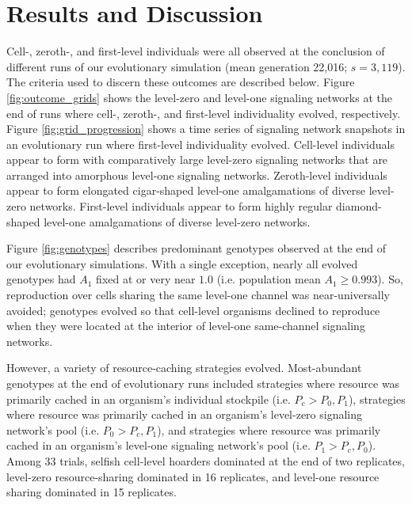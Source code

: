 \section{Results and Discussion}











Cell-, zeroth-, and first-level individuals were all observed at the conclusion of different runs of our evolutionary simulation (mean generation 22,016; $s=3,119$).
The criteria used to discern these outcomes are described below.
Figure \ref{fig:outcome_grids} shows the level-zero and level-one signaling networks at the end of runs where cell-, zeroth-, and first-level individuality evolved, respectively.
Figure \ref{fig:grid_progression} shows a time series of signaling network snapshots in an evolutionary run where first-level individuality evolved.
Cell-level individuals appear to form with comparatively large level-zero signaling networks that are arranged into amorphous level-one signaling networks.
Zeroth-level individuals appear to form elongated cigar-shaped level-one amalgamations of diverse level-zero networks.
First-level individuals appear to form highly regular diamond-shaped level-one amalgamations of diverse level-zero networks.

Figure \ref{fig:genotypes} describes predominant genotypes observed at the end of our evolutionary simulations.
With a single exception, nearly all evolved genotypes had $A_1$ fixed at or very near $1.0$ (i.e. population mean $A_1 \geq 0.993$).
So, reproduction over cells sharing the same level-one channel was near-universally avoided;
genotypes evolved so that cell-level organisms declined to reproduce when they were located at the interior of level-one same-channel signaling networks.

However, a variety of resource-caching strategies evolved.
Most-abundant genotypes at the end of evolutionary runs included strategies where resource was primarily cached in an organism's individual stockpile (i.e. $P_{c} > P_0, P_1$), strategies where resource was primarily cached in an organism's level-zero signaling network's pool (i.e. $P_0 > P_{c}, P_1$), and strategies where resource was primarily cached in an organism's level-one signaling network's pool (i.e. $P_1 > P_{c}, P_0$).
Among 33 trials, selfish cell-level hoarders dominated at the end of two replicates, level-zero resource-sharing dominated in 16 replicates, and level-one resource sharing dominated in 15 replicates.

